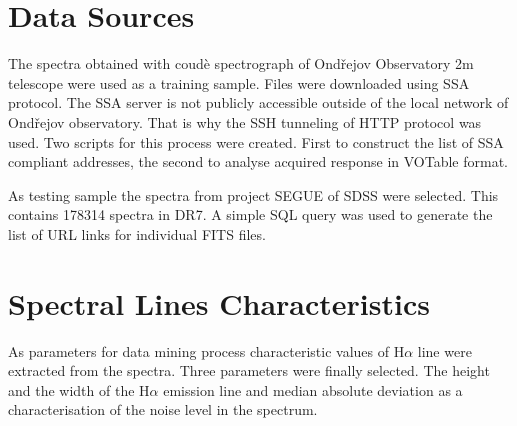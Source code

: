 \documentclass[11pt,twoside]{article}
\begin{document}
%
\section{Data Sources}
The spectra obtained with coud\`e spectrograph of Ond\v{r}ejov
Observatory 2m telescope were used as a training sample. Files were
downloaded using SSA protocol. The SSA server is not publicly
accessible outside of the local network of Ond\v{r}ejov observatory.
That is why the SSH tunneling of HTTP protocol was used. Two scripts
for this process were created. First to construct the list of SSA
compliant addresses, the second to analyse acquired response in
VOTable format.

As testing sample the spectra from project SEGUE of SDSS were
selected. This contains 178314 spectra in DR7. A simple SQL query was
used to generate the list of URL links for individual FITS
files. 


\section{Spectral Lines Characteristics}
As parameters for data mining process characteristic values of
H$\alpha$ line were extracted from the spectra. Three parameters were
finally selected. The height and the width of the H$\alpha$ emission
line and median absolute deviation as a characterisation of the noise
level in the spectrum.
\end{document}
